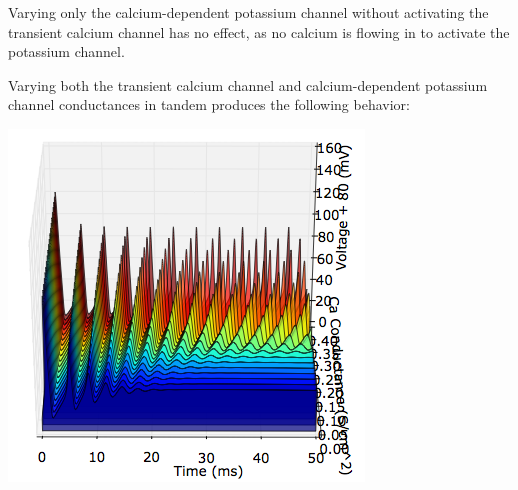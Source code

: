 \documentclass[12pt]{article}
\begin{document}
\vspace{10pt}

Varying only the calcium-dependent potassium channel without activating the transient calcium channel has no effect, as no calcium is flowing in to activate the potassium channel.  

Varying both the transient calcium channel and calcium-dependent potassium channel conductances in tandem produces the following behavior:

\includegraphics[scale=0.7]{kca.png}
\end{document}
